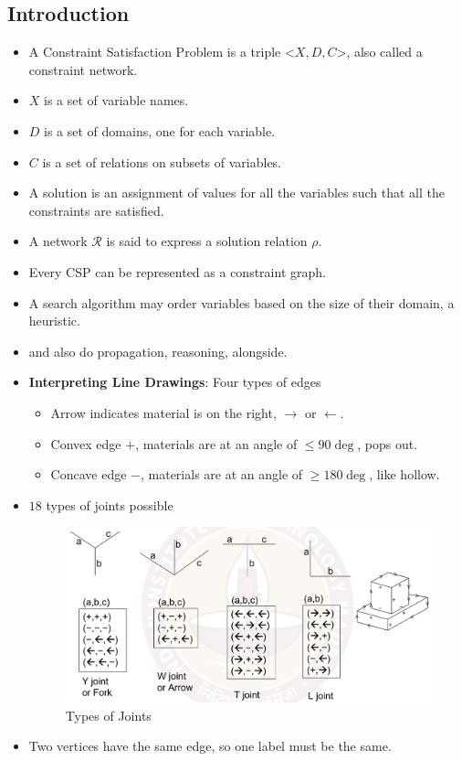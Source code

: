 \documentclass[a4paper]{article}
\begin{document}
\subsection{Introduction}
\begin{itemize}
    \item A Constraint Satisfaction Problem is a triple <$X,D,C$>, also called a constraint network.
    \item $X$ is a set of variable names.
    \item $D$ is a set of domains, one for each variable.
    \item $C$ is a set of relations on subsets of variables.
    \item A solution is an assignment of values for all the variables such that all the constraints are satisfied.
    \item A network $\mathcal{R}$ is said to express a solution relation $\rho$.
    \item Every CSP can be represented as a constraint graph.
    \item A search algorithm may order variables based on the size of their domain, a heuristic.
    \item and also do propagation, reasoning, alongside.
    \item \textbf{Interpreting Line Drawings}: Four types of edges
    \begin{itemize}
        \item Arrow indicates material is on the right, $\to$ or $\gets$.
        \item Convex edge $+$, materials are at an angle of $\leq 90\deg$, pops out.
        \item Concave edge $-$, materials are at an angle of $\geq 180\deg$, like hollow.
    \end{itemize}
    \item $18$ types of joints possible
    \begin{figure}[H]
        \centering
        \includegraphics[width=0.8\linewidth]{Degree/static/AI_interpreting_line_drawing.png}
        \caption{Types of Joints}
    \end{figure}
    \item Two vertices have the same edge, so one label must be the same.
\end{itemize}
\end{document}
